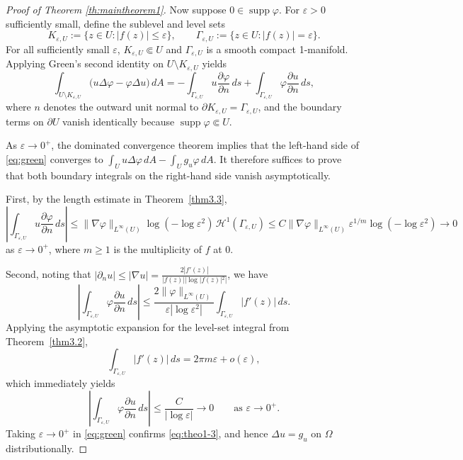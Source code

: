 \documentclass[12pt,twoside]{amsart}
\numberwithin{equation}{section}
\numberwithin{definition}{section} %
\begin{document}
\begin{proof}[Proof of Theorem \ref{th:maintheorem1}]
Now suppose $0 \in \operatorname{supp} \varphi$. For $\varepsilon > 0$ sufficiently small, define the sublevel and level sets
\[
K_{\varepsilon, U} := \{z \in U : |f(z)| \le \varepsilon\}, \qquad \Gamma_{\varepsilon, U} := \{z \in U : |f(z)| = \varepsilon\}.
\]
For all sufficiently small $\varepsilon$, $K_{\varepsilon, U} \Subset U$ and $\Gamma_{\varepsilon, U}$ is a smooth compact 1-manifold. Applying Green's second identity on $U \setminus K_{\varepsilon, U}$ yields
\begin{equation}\label{eq:green}
\int_{U \setminus K_{\varepsilon, U}} \bigl( u \Delta \varphi - \varphi \Delta u \bigr) \, dA = - \int_{\Gamma_{\varepsilon, U}} u \frac{\partial \varphi}{\partial n} \, ds + \int_{\Gamma_{\varepsilon, U}} \varphi \frac{\partial u}{\partial n} \, ds,
\end{equation}
where $n$ denotes the outward unit normal to $\partial K_{\varepsilon, U} = \Gamma_{\varepsilon, U}$, and the boundary terms on $\partial U$ vanish identically because $\operatorname{supp} \varphi \Subset U$.

As $\varepsilon \to 0^+$, the dominated convergence theorem implies that the left-hand side of \eqref{eq:green} converges to $\int_U u \Delta \varphi \, dA - \int_U g_u \varphi \, dA$. It therefore suffices to prove that both boundary integrals on the right-hand side vanish asymptotically.

First, by the length estimate in Theorem~\ref{thm3.3},
\[
\left| \int_{\Gamma_{\varepsilon, U}} u \frac{\partial \varphi}{\partial n} \, ds \right| \le \|\nabla \varphi\|_{L^\infty(U)} \log(-\log \varepsilon^2) \, \mathcal{H}^1(\Gamma_{\varepsilon, U}) \le C \|\nabla \varphi\|_{L^\infty(U)} \varepsilon^{1/m} \log(-\log \varepsilon^2) \longrightarrow 0
\]
as $\varepsilon \to 0^+$, where $m \ge 1$ is the multiplicity of $f$ at $0$.

Second, noting that $|\partial_n u| \le |\nabla u| = \frac{2|f'(z)|}{|f(z)| |\log|f(z)|^2|}$, we have
\[
\left| \int_{\Gamma_{\varepsilon, U}} \varphi \frac{\partial u}{\partial n} \, ds \right| \le \frac{2\|\varphi\|_{L^\infty(U)}}{\varepsilon |\log \varepsilon^2|} \int_{\Gamma_{\varepsilon, U}} |f'(z)| \, ds.
\]
Applying the asymptotic expansion for the level-set integral from Theorem~\ref{thm3.2},
\[
\int_{\Gamma_{\varepsilon, U}} |f'(z)| \, ds = 2\pi m \varepsilon + o(\varepsilon),
\]
which immediately yields
\[
\left| \int_{\Gamma_{\varepsilon, U}} \varphi \frac{\partial u}{\partial n} \, ds \right| \le \frac{C}{|\log \varepsilon|} \longrightarrow 0 \qquad \text{as } \varepsilon \to 0^+.
\]
Taking $\varepsilon \to 0^+$ in \eqref{eq:green} confirms \eqref{eq:theo1-3}, and hence $\Delta u = g_u$ on $\Omega$ distributionally.


\end{proof}
\end{document}
